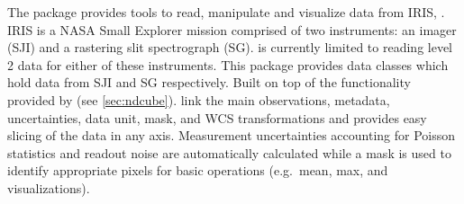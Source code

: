 The  package provides tools to read, manipulate and visualize data from IRIS, \citep{DePontieu2014}.
IRIS is a NASA Small Explorer mission comprised of two instruments: an imager (SJI) and a rastering slit spectrograph (SG).
 is currently limited to reading level 2 data for either of these instruments.
This package provides data classes which hold data from SJI and SG respectively.
Built on top of the functionality provided by  (see \autoref{sec:ndcube}).  link the main observations, metadata, uncertainties, data unit, mask, and WCS transformations and provides easy slicing of the data in any axis.
Measurement uncertainties accounting for Poisson statistics and readout noise are automatically calculated while a mask is used to identify appropriate pixels for basic operations (e.g.\ mean, max, and visualizations).
